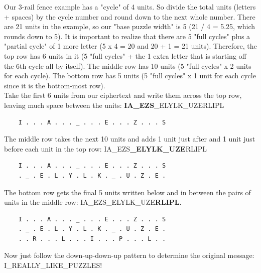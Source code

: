 \documentclass{article}
\begin{document}
Our 3-rail fence example has a "cycle" of 4 units. So divide the total units (letters + spaces) by the cycle number and round down to the next whole number. There are 21 units in the example, so our "base puzzle width" is 5 (21 / 4 = 5.25, which rounds down to 5). It is important to realize that there are 5 "full cycles" plus a "partial cycle" of 1 more letter (5 x 4 = 20 and 20 + 1 = 21 units). Therefore, the top row has 6 units in it (5 "full cycles" + the 1 extra letter that is starting off the 6th cycle all by itself). The middle row has 10 units (5 "full cycles" x 2 units for each cycle). The bottom row has 5 units (5 "full cycles" x 1 unit for each cycle since it is the bottom-most row).\\[1\baselineskip]
Take the first 6 units from our ciphertext and write them across the top row, leaving much space between the units: {\bf IA\_EZS}\_ELYLK\_UZERLIPL
\begin{lstlisting}
    I . . . A . . . _ . . . E . . . Z . . . S
\end{lstlisting}
The middle row takes the next 10 units and adds 1 unit just after and 1 unit just before each unit in the top row: IA\_EZS{\bf \_ELYLK\_UZE}RLIPL
\begin{lstlisting}
    I . . . A . . . _ . . . E . . . Z . . . S
    . _ . E . L . Y . L . K . _ . U . Z . E .
\end{lstlisting}
The bottom row gets the final 5 units written below and in between the pairs of units in the middle row: IA\_EZS\_ELYLK\_UZE{\bf RLIPL}.
\begin{lstlisting}
    I . . . A . . . _ . . . E . . . Z . . . S
    . _ . E . L . Y . L . K . _ . U . Z . E .
    . . R . . . L . . . I . . . P . . . L . .
\end{lstlisting}
Now just follow the down-up-down-up pattern to determine the original message: I\_REALLY\_LIKE\_PUZZLES!
\end{document}
